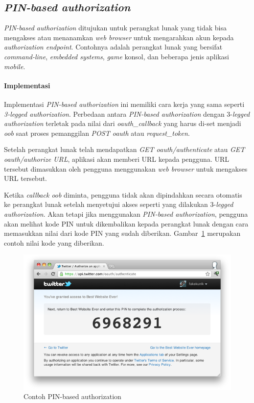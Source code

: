 \subsection{\textit{PIN-based authorization}}
\textit{PIN-based authorization} ditujukan untuk perangkat lunak yang tidak bisa mengakses atau menanamkan \textit{web browser} untuk mengarahkan akun kepada \textit{authorization endpoint}. Contohnya adalah perangkat lunak yang bersifat \textit{command-line}, \textit{embedded systems}, \textit{game} konsol, dan beberapa jenis aplikasi \textit{mobile}.


\paragraph{Implementasi}

Implementasi \textit{PIN-based authorization} ini memiliki cara kerja yang sama seperti \textit{3-legged authorization}. Perbedaan antara \textit{PIN-based authorization} dengan 3-\textit{legged authorization} terletak pada nilai dari \textit{oauth\_callback} yang harus di-set menjadi \textit{oob} saat proses pemanggilan \textit{POST oauth} atau \textit{request\_token}.

Setelah perangkat lunak telah mendapatkan \textit{GET oauth/authenticate} atau \textit{GET oauth/authorize URL}, aplikasi akan memberi URL kepada pengguna. URL tersebut dimasukkan oleh pengguna menggunakan \textit{web browser} untuk mengakses URL tersebut.

Ketika \textit{callback oob} diminta, pengguna tidak akan dipindahkan secara otomatis ke perangkat lunak setelah menyetujui akses seperti yang dilakukan 3-\textit{legged authorization}. Akan tetapi jika menggunakan \textit{PIN-based authorization}, pengguna akan melihat kode PIN untuk dikembalikan kepada perangkat lunak dengan cara memasukkan nilai dari kode PIN yang sudah diberikan. Gambar~\ref{fig:pin} merupakan contoh nilai kode yang diberikan.

\begin{figure}[H]
\centering
\includegraphics{Gambar/pin.png}
\caption{Contoh PIN-based authorization}
	\label{fig:pin}
\end{figure}


